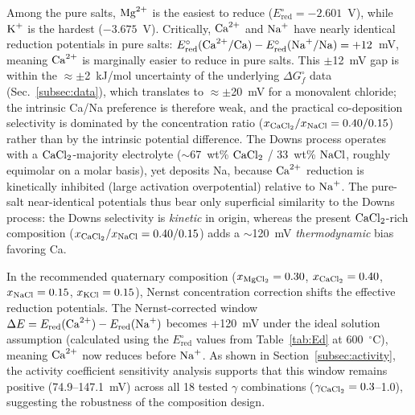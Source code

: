 \documentclass[sn-mathphys,Numbered]{sn-jnl}
\begin{document}
Among the pure salts, $\ce{Mg^{2+}}$ is the easiest to reduce ($E^{\circ}_{\mathrm{red}} = -2.601$~V), while $\ce{K+}$ is the hardest ($-3.675$~V). Critically, $\ce{Ca^{2+}}$ and $\ce{Na+}$ have nearly identical reduction potentials in pure salts: $E^{\circ}_{\mathrm{red}}(\ce{Ca^{2+}/Ca}) - E^{\circ}_{\mathrm{red}}(\ce{Na+/Na}) = +12$~mV, meaning $\ce{Ca^{2+}}$ is marginally easier to reduce in pure salts. This $\pm$12~mV gap is within the $\approx\pm$2~kJ/mol uncertainty of the underlying $\Delta G^{\circ}_f$ data (Sec.~\ref{subsec:data}), which translates to $\approx\pm$20~mV for a monovalent chloride; the intrinsic Ca/Na preference is therefore weak, and the practical co-deposition selectivity is dominated by the concentration ratio ($x_{\ce{CaCl2}}/x_{\ce{NaCl}} = 0.40/0.15$) rather than by the intrinsic potential difference. The Downs process operates with a $\ce{CaCl2}$-majority electrolyte ($\sim$67~wt\% $\ce{CaCl2}$ / 33~wt\% $\ce{NaCl}$, roughly equimolar on a molar basis), yet deposits Na, because $\ce{Ca^{2+}}$ reduction is kinetically inhibited (large activation overpotential) relative to $\ce{Na+}$. The pure-salt near-identical potentials thus bear only superficial similarity to the Downs process: the Downs selectivity is \emph{kinetic} in origin, whereas the present $\ce{CaCl2}$-rich composition ($x_{\ce{CaCl2}}/x_{\ce{NaCl}} = 0.40/0.15$) adds a $\sim$120~mV \emph{thermodynamic} bias favoring Ca.

In the recommended quaternary composition ($x_{\ce{MgCl2}}=0.30$, $x_{\ce{CaCl2}}=0.40$, $x_{\ce{NaCl}}=0.15$, $x_{\ce{KCl}}=0.15$), Nernst concentration correction shifts the effective reduction potentials. The Nernst-corrected window $\Delta E = E_{\mathrm{red}}(\ce{Ca^{2+}}) - E_{\mathrm{red}}(\ce{Na+})$ becomes +120~mV under the ideal solution assumption (calculated using the $E^{\circ}_{\mathrm{red}}$ values from Table~\ref{tab:Ed} at 600~$^{\circ}$C), meaning $\ce{Ca^{2+}}$ now reduces before $\ce{Na+}$. As shown in Section~\ref{subsec:activity}, the activity coefficient sensitivity analysis supports that this window remains positive (74.9--147.1~mV) across all 18 tested $\gamma$ combinations ($\gamma_{\ce{CaCl2}} = 0.3$--1.0), suggesting the robustness of the composition design.
\end{document}
